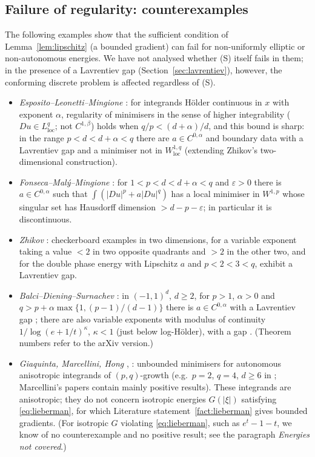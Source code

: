 \documentclass[11pt]{amsart}
\theoremstyle{definition}
\theoremstyle{remark}
\numberwithin{equation}{section}
\newcommand{\abs}[1]{\lvert #1\rvert}
\begin{document}
\subsection{Failure of regularity: counterexamples}\label{ssec:counter}
The following examples show that the sufficient condition of Lemma~\ref{lem:lipschitz} (a bounded gradient) can fail for non-uniformly elliptic or non-autonomous energies. We have not analysed whether (S) itself fails in them; in the presence of a Lavrentiev gap (Section~\ref{sec:lavrentiev}), however, the conforming discrete problem is affected regardless of (S).
\begin{itemize}[leftmargin=1.5em]
\item \emph{Esposito--Leonetti--Mingione} \cite{ELM2004}: for integrands H\"older continuous in $x$ with exponent $\alpha$, regularity of minimisers in the sense of higher integrability ($Du\in L^q_{\mathrm{loc}}$; not $C^{1,\beta}$) holds when $q/p<(d+\alpha)/d$, and this bound is sharp: in the range $p<d<d+\alpha<q$ there are $a\in C^{0,\alpha}$ and boundary data with a Lavrentiev gap and a minimiser not in $W^{1,q}_{\mathrm{loc}}$ (extending Zhikov's two-dimensional construction).
\item \emph{Fonseca--Mal\'y--Mingione} \cite{FMM2004}: for $1<p<d<d+\alpha<q$ and $\varepsilon>0$ there is $a\in C^{0,\alpha}$ such that $\int(\abs{Du}^p+a\abs{Du}^q)$ has a local minimiser in $W^{1,p}$ whose singular set has Hausdorff dimension $>d-p-\varepsilon$; in particular it is discontinuous.
\item \emph{Zhikov} \cite{Zhikov1986,Zhikov1995}: checkerboard examples in two dimensions, for a variable exponent taking a value $<2$ in two opposite quadrants and $>2$ in the other two, and for the double phase energy with Lipschitz $a$ and $p<2<3<q$, exhibit a Lavrentiev gap.
\item \emph{Balci--Diening--Surnachev} \cite{BDS2020}: in $(-1,1)^d$, $d\ge2$, for $p>1$, $\alpha>0$ and $q>p+\alpha\max\{1,(p-1)/(d-1)\}$ there is $a\in C^{0,\alpha}$ with a Lavrentiev gap \cite[Thm.~32]{BDS2020}; there are also variable exponents with modulus of continuity $1/\log(e+1/t)^\kappa$, $\kappa<1$ (just below log-H\"older), with a gap \cite[Thm.~30]{BDS2020}. (Theorem numbers refer to the arXiv version.)
\item \emph{Giaquinta, Marcellini, Hong} \cite{Giaquinta1987,Hong1992}, \cite[\S6]{Marcellini1991}: unbounded minimisers for autonomous anisotropic integrands of $(p,q)$-growth (e.g.\ $p=2$, $q=4$, $d\ge6$ in \cite{Giaquinta1987}; Marcellini's papers \cite{Marcellini1989,Marcellini1991} contain mainly positive results). These integrands are anisotropic; they do not concern isotropic energies $G(\abs\xi)$ satisfying \eqref{eq:lieberman}, for which Literature statement~\ref{fact:lieberman} gives bounded gradients. (For isotropic $G$ violating \eqref{eq:lieberman}, such as $e^t-1-t$, we know of no counterexample and no positive result; see the paragraph \emph{Energies not covered}.)

\end{itemize}
\end{document}
